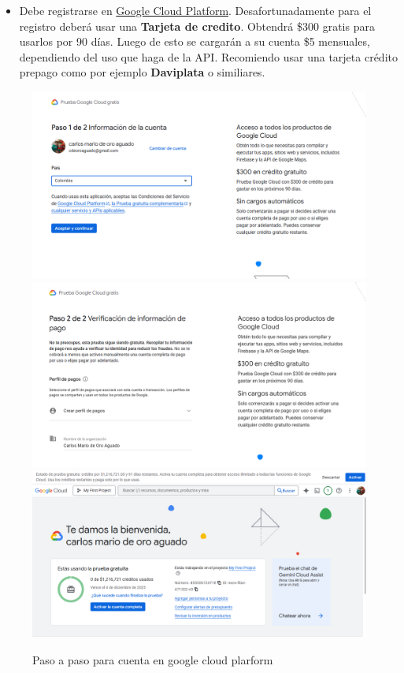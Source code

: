 \documentclass[
]{book}
\providecommand{\tightlist}{%
  \setlength{\itemsep}{0pt}\setlength{\parskip}{0pt}}
\begin{document}
\begin{itemize}
\tightlist
\item
  Debe registrarse en \href{https://cloud.google.com/?utm_source=google&utm_medium=cpc&utm_campaign=latam-CO-all-es-dr-BKWS-all-all-trial-e-dr-1009897-LUAC0010194&utm_content=text-ad-none-any-DEV_c-CRE_512364917177-ADGP_Hybrid\%20\%7C\%20BKWS\%20-\%20EXA\%20\%7C\%20Txt\%20~\%20GCP_General-KWID_43700062784667359-kwd-301173107504&utm_term=KW_google\%20cloud\%20platform-ST_Google\%20Cloud\%20Platform&gclid=CjwKCAjw4qCKBhAVEiwAkTYsPMpxBldfpHxltrcNo-vuwoMUKQlLmRZisZRsQyeI2Iv0QTeZRpjnFRoCBoYQAvD_BwE&gclsrc=aw.ds}{Google Cloud Platform}. Desafortunadamente para el registro deberá usar una \textbf{Tarjeta de credito}. Obtendrá \$300 gratis para usarlos por 90 días. Luego de esto se cargarán a su cuenta \$5 mensuales, dependiendo del uso que haga de la API. Recomiendo usar una tarjeta crédito prepago como por ejemplo \textbf{Daviplata} o similiares.
\end{itemize}

\begin{figure}

{\centering \includegraphics[width=0.7\linewidth]{images/gcp1} \includegraphics[width=0.7\linewidth]{images/gcp2} \includegraphics[width=0.7\linewidth]{images/gcp3} 

}

\caption{Paso a paso para cuenta en google cloud plarform}\label{fig:gcp-fig}
\end{figure}
\end{document}

